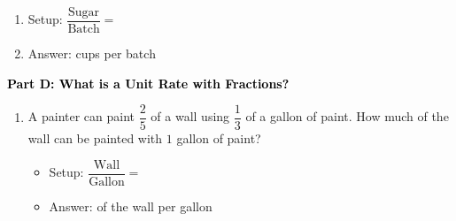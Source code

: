 \documentclass[12pt, letterpaper, fleqn]{article}
\newcommand{\blank}{\underline{\hspace{2.2cm}}}
\newcommand{\blanklong}{\underline{\hspace{6.5cm}}}
\begin{document}
\vspace{3mm}

\begin{enumerate}[itemsep=2.2cm, leftmargin=0.6cm, resume]
\item Setup: $\dfrac{\text{Sugar}}{\text{Batch}} = $ \blanklong
    \vspace{0.5cm}
\item Answer: \blank cups per batch
\end{enumerate}

\newpage

\begin{tcolorbox}[colback=customteal!20]
\large\textcolor{black}{\textbf{Part D: What is a Unit Rate with Fractions?}}
\end{tcolorbox}

\vspace{3mm}

\begin{enumerate}[itemsep=2.2cm, leftmargin=0.6cm, resume]
\item A painter can paint $\dfrac{2}{5}$ of a wall using $\dfrac{1}{3}$ of a gallon of paint. How much of the wall can be painted with $1$ gallon of paint?
\vspace{1cm}
\begin{itemize}
\item Setup: $\dfrac{\text{Wall}}{\text{Gallon}} = $ \blanklong
    \vspace{0.5cm}
\item Answer: \blank of the wall per gallon
\end{itemize}
\end{enumerate}
\end{document}
